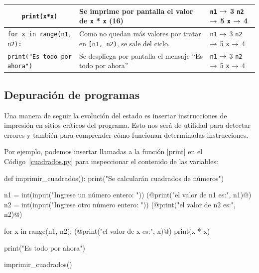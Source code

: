 \begin{longtable}[c]{p{5.5cm} p{5.5cm} p{1.5cm}}
\hline
\lstinline+    print(x*x)+
&
Se imprime por pantalla el valor de \lstinline!x! * \lstinline!x! (16)
&
\lstinline!n1! $\rightarrow$ 3 \newline
\lstinline!n2! $\rightarrow$ 5 \newline
\lstinline!x! $\rightarrow$ 4 \\

\hline
\lstinline+for x in range(n1, n2):+
&
Como no quedan más valores por tratar en \lstinline![n1, n2)!,
se sale del ciclo.
&
\lstinline!n1! $\rightarrow$ 3 \newline
\lstinline!n2! $\rightarrow$ 5 \newline
\lstinline!x! $\rightarrow$ 4 \\

\hline
\lstinline+print("Es todo por ahora")+
&
Se despliega por pantalla el mensaje ``Es todo por ahora''
&
\lstinline!n1! $\rightarrow$ 3 \newline
\lstinline!n2! $\rightarrow$ 5 \newline
\lstinline!x! $\rightarrow$ 4 \\

\end{longtable}

\subsection{Depuración de programas}

Una manera de seguir la evolución del estado es insertar instrucciones de impresión
en sitios críticos del programa. Esto nos será de utilidad para detectar errores
y también para comprender cómo funcionan determinadas instrucciones.

Por ejemplo, podemos insertar llamadas a la función |print| en el
Código~\ref{cuadrados.py} para inspeccionar el contenido de las variables:

\begin{codigo-python-sn}
def imprimir_cuadrados():
    print("Se calcularán cuadrados de números")

    n1 = int(input("Ingrese un número entero: "))
    (@print("el valor de n1 es:", n1)@)
    n2 = int(input("Ingrese otro número entero: "))
    (@print("el valor de n2 es:", n2)@)

    for x in range(n1, n2):
        (@print("el valor de x es:", x)@)
        print(x * x)

    print("Es todo por ahora")

imprimir_cuadrados()
\end{codigo-python-sn}

